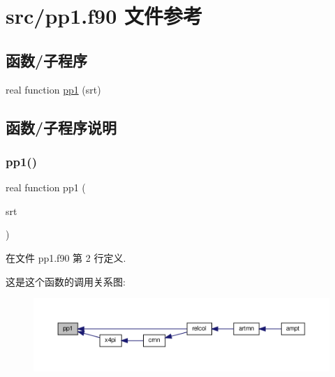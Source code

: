 \hypertarget{pp1_8f90}{}\section{src/pp1.f90 文件参考}
\label{pp1_8f90}
\subsection*{函数/子程序}
\begin{DoxyCompactItemize}
\item 
real function \mbox{\hyperlink{pp1_8f90_ae7bbc15a7f50d997dc6e9e91aaddda56}{pp1}} (srt)
\end{DoxyCompactItemize}


\subsection{函数/子程序说明}
\mbox{\label{pp1_8f90_ae7bbc15a7f50d997dc6e9e91aaddda56}} 
\subsubsection{\texorpdfstring{pp1()}{pp1()}}
{\footnotesize\ttfamily real function pp1 (\begin{DoxyParamCaption}\item[{}]{srt }\end{DoxyParamCaption})}



在文件 pp1.\+f90 第 2 行定义.

这是这个函数的调用关系图\+:
\nopagebreak
\begin{figure}[H]
\begin{center}
\leavevmode
\includegraphics[width=350pt]{pp1_8f90_ae7bbc15a7f50d997dc6e9e91aaddda56_icgraph}
\end{center}
\end{figure}
